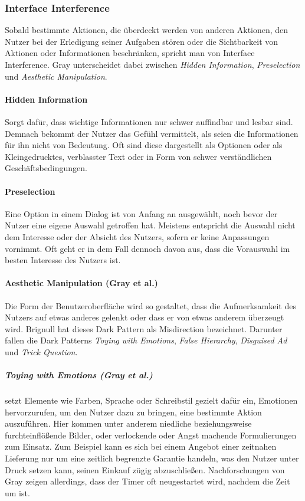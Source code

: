 \documentclass[a4paper]{article}
\begin{document}
\subsubsection{Interface Interference}
\label{sssec:interface_interference}
Sobald bestimmte Aktionen, die überdeckt werden von anderen Aktionen, den Nutzer bei der Erledigung seiner Aufgaben stören oder die Sichtbarkeit von Aktionen oder Informationen beschränken, spricht man von Interface Interference. 
Gray \cite{gray} unterscheidet dabei zwischen \textit{Hidden Information}, \textit{Preselection} und \textit{Aesthetic Manipulation}. 

\paragraph{Hidden Information}
\label{para:hidden_information}
Sorgt dafür, dass wichtige Informationen nur schwer auffindbar und lesbar sind. Demnach bekommt der Nutzer das Gefühl vermittelt, als seien die Informationen für ihn nicht von Bedeutung. Oft sind diese dargestellt als Optionen oder als Kleingedrucktes, verblasster Text oder in Form von schwer verständlichen Geschäftsbedingungen.

\paragraph{Preselection}
\label{para:preselection}
Eine Option in einem Dialog ist von Anfang an ausgewählt, noch bevor der Nutzer eine eigene Auswahl getroffen hat. Meistens entspricht die Auswahl nicht dem Interesse oder der Absicht des Nutzers, sofern er keine Anpassungen vornimmt. Oft geht er in dem Fall dennoch davon aus, dass die Vorauswahl im besten Interesse des Nutzers ist. 
 
\paragraph{Aesthetic Manipulation (Gray et al.)}
\label{para:aesthetic_manipulation}
Die Form der Benutzeroberfläche wird so gestaltet, dass die Aufmerksamkeit des Nutzers auf etwas anderes gelenkt oder dass er von etwas anderem überzeugt wird. Brignull hat dieses Dark Pattern als \glqq Misdirection\grqq{} bezeichnet. 
Darunter fallen die Dark Patterns \textit{Toying with Emotions}, \textit{False Hierarchy}, \textit{Disguised Ad} und \textit{Trick Question}.

\subparagraph{Toying with Emotions (Gray et al.)} 
\label{subpara:toying_with_emotions}
setzt Elemente wie Farben, Sprache oder Schreibstil gezielt dafür ein, Emotionen hervorzurufen, um den Nutzer dazu zu bringen, eine bestimmte Aktion auszuführen. Hier kommen unter anderem niedliche beziehungsweise furchteinflößende Bilder, oder verlockende oder Angst machende Formulierungen zum Einsatz. Zum Beispiel kann es sich bei einem Angebot einer zeitnahen Lieferung nur um eine zeitlich begrenzte Garantie handeln, was den Nutzer unter Druck setzen kann, seinen Einkauf zügig abzuschließen. Nachforschungen von Gray zeigen allerdings, dass der Timer oft neugestartet wird, nachdem die Zeit um ist. 
\end{document}
